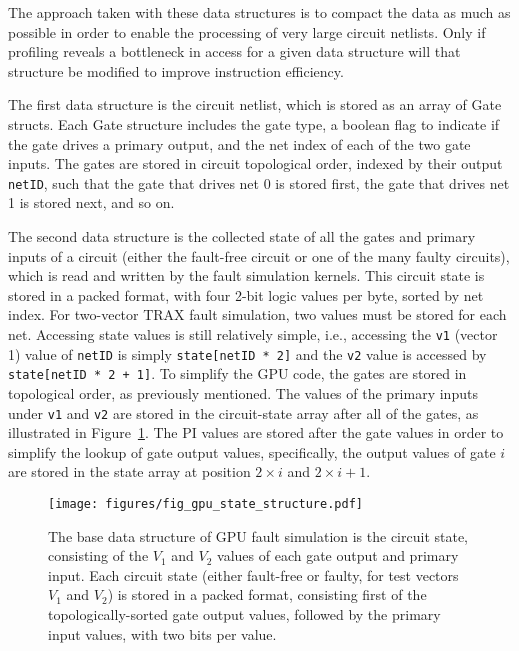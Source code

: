 The approach taken with these data structures is to compact the data as much as possible in order to enable the processing of very large circuit netlists.
%
Only if profiling reveals a bottleneck in access for a given data structure will that structure be modified to improve instruction efficiency.

The first data structure is the circuit netlist, which is stored as an array of Gate structs.
%
Each Gate structure includes the gate type, a boolean flag to indicate if the gate drives a primary output, and the net index of each of the two gate inputs.
%
The gates are stored in circuit topological order, indexed by their output \verb+netID+, such that the gate that drives net 0 is stored first, the gate that drives net 1 is stored next, and so on.

The second data structure is the collected state of all the gates and primary inputs of a circuit (either the fault-free circuit or one of the many faulty circuits), which is read and written by the fault simulation kernels.
%
This circuit state is stored in a packed format, with four 2-bit logic values per byte, sorted by net index.
%
For two-vector TRAX fault simulation, two values must be stored for each net.
%
Accessing state values is still relatively simple, i.e., accessing the \verb+v1+ (vector 1) value of \verb+netID+ is simply \verb+state[netID * 2]+ and the \verb+v2+ value is accessed by \verb=state[netID * 2 + 1]=.
%
To simplify the GPU code, the gates are stored in topological order, as previously mentioned.
%
The values of the primary inputs under \verb+v1+ and \verb+v2+ are stored in the circuit-state array after all of the gates, as illustrated in Figure~\ref{fig:trax_gpu_state_structure}.
%
The PI values are stored after the gate values in order to simplify the lookup of gate output values, specifically, the output values of gate $i$ are stored in the state array at position $2 \times i$ and $2 \times i + 1$.

\begin{figure}[hbtp]
\centering
\texttt{[image: figures/fig\_gpu\_state\_structure.pdf]}
\caption{The base data structure of GPU fault simulation is the circuit state, consisting of the $V_1$ and $V_2$ values of each gate output and primary input.
%
Each circuit state (either fault-free or faulty, for test vectors $V_1$ and $V_2$) is stored in a packed format, consisting first of the topologically-sorted gate output values, followed by the primary input values, with two bits per value.}
\label{fig:trax_gpu_state_structure}
\end{figure}

